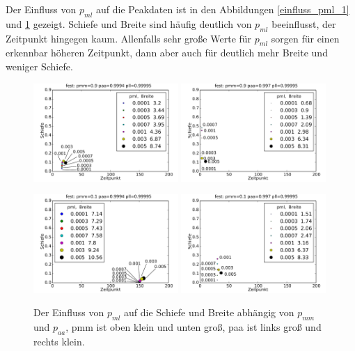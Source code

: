 Der Einfluss von $p_{ml}$ auf die Peakdaten ist in den Abbildungen \ref{einfluss_pml_1} und \ref{einfluss_pml_2} gezeigt. Schiefe und Breite sind häufig deutlich von $p_{ml}$ beeinflusst, der Zeitpunkt hingegen kaum. Allenfalls sehr große Werte für $p_{ml}$ sorgen für einen erkennbar höheren Zeitpunkt, dann aber auch für deutlich mehr Breite und weniger Schiefe.

\begin{figure}[h]
\includegraphics[width=0.49\textwidth]{bilder/pml/3fest_09_p_09994_099995}
\includegraphics[width=0.49\textwidth]{bilder/pml/3fest_09_p_0997_099995}

\vspace*{5pt}

\includegraphics[width=0.49\textwidth]{bilder/pml/3fest_01_p_09994_099995}
\includegraphics[width=0.49\textwidth]{bilder/pml/3fest_01_p_0997_099995}
\caption[Der Einfluss von $p_{ml}$ auf die Schiefe und Breite abhängig von $p_{mm}$ und $p_{aa}$]{Der Einfluss von $p_{ml}$ auf die Schiefe und Breite abhängig von $p_{mm}$ und $p_{aa}$, pmm ist oben klein und unten groß, paa ist links groß und rechts klein.}
\label{einfluss_pml_2}
\end{figure}

